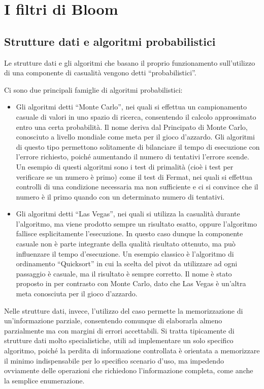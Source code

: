 \chapter{I filtri di Bloom}

\section{Strutture dati e algoritmi probabilistici}

Le strutture dati e gli algoritmi che basano il proprio funzionamento sull'utilizzo di una componente
di casualità vengono detti ``probabilistici''. 

Ci sono due principali famiglie di algoritmi probabilistici:

\begin{itemize}
	\medskip

	\item Gli algoritmi detti ``Monte Carlo'', nei quali si effettua un campionamento casuale di
	valori in uno spazio di ricerca, consentendo il calcolo approssimato entro una certa
	probabilità. Il nome deriva dal Principato di Monte Carlo, conosciuto a livello mondiale come
	meta per il gioco d'azzardo. Gli algoritmi di questo tipo permettono solitamente di bilanciare
	il tempo di esecuzione con l'errore richiesto, poiché aumentando il numero di tentativi l'errore
	scende. Un esempio di questi algoritmi sono i test di primalità (cioè i test per verificare se
	un numero è primo) come il test di Fermat, nei quali si effettua controlli di una condizione
	necessaria ma non sufficiente e ci si convince che il numero è il primo quando con un
	determinato numero di tentativi.

	\item Gli algoritmi detti ``Las Vegas'', nei quali si utilizza la casualità durante l'algoritmo,
	ma viene prodotto sempre un risultato esatto, oppure l'algoritmo fallisce esplicitamente
	l'esecuzione. In questo caso dunque la componente casuale non è parte integrante della qualità
	risultato ottenuto, ma può influenzare il tempo d'esecuzione. Un esempio classico è l'algoritmo
	di ordinamento ``Quicksort'' in cui la scelta del pivot da utilizzare ad ogni passaggio è
	casuale, ma il risultato è sempre corretto. Il nome è stato proposto in \cite{lasvegas} per
	contrasto con Monte Carlo, dato che Las Vegas è un'altra meta conosciuta per il gioco d'azzardo.
\end{itemize}

Nelle strutture dati, invece, l'utilizzo del caso permette la memorizzazione di un'informazione
parziale, consentendo comunque di elaborarla almeno parzialmente ma con margini di errori
accettabili. Si tratta tipicamente di strutture dati molto specialistiche, utili ad implementare un
solo specifico algoritmo, poiché la perdita di informazione controllata è orientata a memorizzare il
minimo indispensabile per lo specifico scenario d'uso, ma impedendo ovviamente delle operazioni che
richiedono l'informazione completa, come anche la semplice enumerazione.

